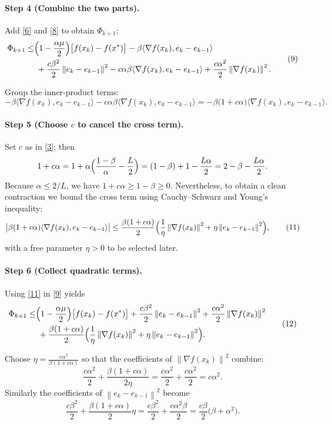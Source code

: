 \documentclass{article}
\newcommand{\norm}[1]{\left\lVert #1\right\rVert}
\newcommand{\ip}[2]{\langle #1,#2\rangle}
\newcommand{\grad}{\nabla}
\begin{document}
\paragraph{Step 4 (Combine the two parts).}
Add \eqref{6} and \eqref{8} to obtain $\Phi_{k+1}$:
\[
\begin{aligned}
\Phi_{k+1}
\le &\Bigl(1-\frac{\alpha\mu}{2}\Bigr)\bigl[f(x_{k})-f(x^{*})\bigr]
-\beta\ip{\grad f(x_{k})}{e_{k}-e_{k-1}}\\
&\;+\frac{c\beta^{2}}{2}\norm{e_{k}-e_{k-1}}^{2}
- c\alpha\beta\ip{\grad f(x_{k})}{e_{k}-e_{k-1}}
+\frac{c\alpha^{2}}{2}\norm{\grad f(x_{k})}^{2}.
\end{aligned}
\tag{9}
\]

Group the inner‑product terms:
\[
-\beta\ip{\grad f(x_{k})}{e_{k}-e_{k-1}}
- c\alpha\beta\ip{\grad f(x_{k})}{e_{k}-e_{k-1}}
= -\beta\bigl(1+c\alpha\bigr)\ip{\grad f(x_{k})}{e_{k}-e_{k-1}}.
\tag{10}
\]

\paragraph{Step 5 (Choose $c$ to cancel the cross term).}
Set $c$ as in \eqref{3}; then
\[
1+c\alpha =1+\alpha\Bigl(\frac{1-\beta}{\alpha}-\frac{L}{2}\Bigr)
= (1-\beta)+1-\frac{L\alpha}{2}
= 2-\beta-\frac{L\alpha}{2}.
\]
Because $\alpha\le 2/L$, we have $1+c\alpha\ge 1-\beta\ge0$.  
Nevertheless, to obtain a clean contraction we bound the cross term using Cauchy–Schwarz and Young’s inequality:
\[
\bigl|\beta(1+c\alpha)\ip{\grad f(x_{k})}{e_{k}-e_{k-1}}\bigr|
\le \frac{\beta(1+c\alpha)}{2}\Bigl(\frac{1}{\eta}\norm{\grad f(x_{k})}^{2}
+\eta\norm{e_{k}-e_{k-1}}^{2}\Bigr),
\tag{11}
\]
with a free parameter $\eta>0$ to be selected later.

\paragraph{Step 6 (Collect quadratic terms).}
Using \eqref{11} in \eqref{9} yields
\[
\begin{aligned}
\Phi_{k+1}\le &
\Bigl(1-\frac{\alpha\mu}{2}\Bigr)\bigl[f(x_{k})-f(x^{*})\bigr]
+\frac{c\beta^{2}}{2}\norm{e_{k}-e_{k-1}}^{2}
+\frac{c\alpha^{2}}{2}\norm{\grad f(x_{k})}^{2}\\
&\;+\frac{\beta(1+c\alpha)}{2}\Bigl(\frac{1}{\eta}\norm{\grad f(x_{k})}^{2}
+\eta\norm{e_{k}-e_{k-1}}^{2}\Bigr).
\end{aligned}
\tag{12}
\]

Choose $\eta=\frac{c\alpha^{2}}{\beta(1+c\alpha)}$ so that the coefficients of $\norm{\grad f(x_{k})}^{2}$ combine:
\[
\frac{c\alpha^{2}}{2}+\frac{\beta(1+c\alpha)}{2\eta}
= \frac{c\alpha^{2}}{2}+\frac{c\alpha^{2}}{2}=c\alpha^{2}.
\tag{13}
\]
Similarly the coefficients of $\norm{e_{k}-e_{k-1}}^{2}$ become
\[
\frac{c\beta^{2}}{2}+ \frac{\beta(1+c\alpha)}{2}\eta
= \frac{c\beta^{2}}{2}+ \frac{c\alpha^{2}\beta}{2}= \frac{c\beta}{2}\bigl(\beta+\alpha^{2}\bigr).
\tag{14}
\]
\end{document}
